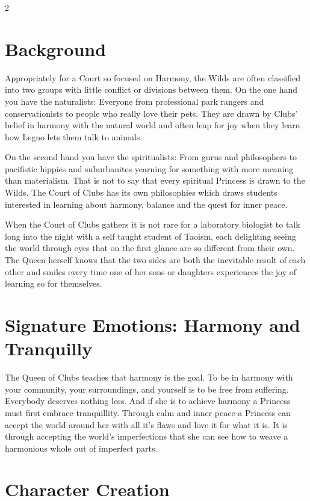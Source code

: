 \begin{multicols}{2}
\section*{Background}

Appropriately for a Court so focused on Harmony, the Wilds are often classified into two groups with little conflict or divisions between them. On the one hand you have the naturalists: Everyone from professional park rangers and conservationists to people who really love their pets. They are drawn by Clubs' belief in harmony with the natural world and often leap for joy when they learn how Legno lets them talk to animals. 

On the second hand you have the spiritualists: From gurus and philosophers to pacifistic hippies and suburbanites yearning for something with more meaning than materialism. That is not to say that every spiritual Princess is drawn to the Wilds. The Court of Clubs has its own philosophies which draws students interested in learning about harmony, balance and the quest for inner peace.

When the Court of Clubs gathers it is not rare for a laboratory biologist to talk long into the night with a self taught student of Taoism, each delighting seeing the world through eyes that on the first glance are so different from their own. The Queen herself knows that the two sides are both the inevitable result of each other and smiles every time one of her sons or daughters experiences the joy of learning so for themselves. 

\section*{Signature Emotions: Harmony and Tranquilly}

The Queen of Clubs teaches that harmony is the goal. To be in harmony with your community, your surroundings, and yourself is to be free from suffering. Everybody deserves nothing less. And if she is to achieve harmony a Princess must first embrace tranquillity. Through calm and inner peace a Princess can accept the world around her with all it's flaws and love it for what it is. It is through accepting the world's imperfections that she can see how to weave a harmonious whole out of imperfect parts.

\section*{Character Creation}


\end{multicols}
